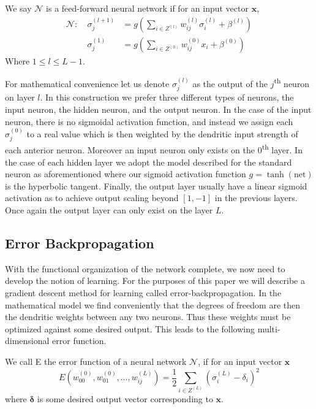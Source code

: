     \begin{definition}
    
    We say $\mathcal{N}$ is a feed-forward neural network if for an input vector $\pmb{x}$,
    \[
        \begin{aligned}
        \mathcal{N}:\ & \sigma_j^{(l+1)} &= g\left(\sum_{i \in Z^{(l)}}w_{ij}^{(l)}\sigma_i^{(l)} + \beta^{(l)}\right) \\ & \sigma_j^{(1)} &= g\left(\sum_{i \in Z^{(0)}}w_{ij}^{(0)}x_i + \beta^{(0)} \right)
        \end{aligned}
    \]
    Where $1\leq l \leq L-1$. 
    \end{definition}
    
    For mathematical convenience let us denote \( \sigma_j^{(l)}\) as the output of the \(j\)\textsuperscript{th} neuron on layer \(l\). In this construction we prefer three different types of neurons, the input neuron, the hidden neuron, and the output neuron. In the case of the input neuron, there is no sigmoidal activation function, and instead we assign each \( \sigma_j^{(0)}\) to a real value which is then weighted by the dendritic input strength of each anterior neuron. Moreover an input neuron only exists on the \(0\)\textsuperscript{th} layer. In the case of each hidden layer we adopt the model described for the standard neuron as aforementioned where our sigmoid activation function \(g = \tanh(\mathrm{net})\)  is the hyperbolic tangent.%
Finally, the output layer usually have a linear sigmoid activation as to achieve output scaling beyond \([1,-1]\) in the previous layers. Once again the output layer can only exist on the layer \(L\).  

\subsection{Error Backpropagation}
   With the  functional organization of the network complete, we now need to develop the notion of learning. For the purposes of this paper we will describe a gradient descent method for learning called error-backpropagation. In the mathematical model we find conveniently that the degrees of freedom are then the dendritic weights between any two neurons. Thus these weights must be optimized against some desired output. This leads to the following multi-dimensional error function.
   \begin{definition} We call E the error function of a neural network $\mathcal{N}$, if for an input vector \(\pmb{x}\)
\[ E\left(w_{00}^{(0)}, w_{01}^{(0)}, \dots ,w_{ij}^{(L)}\right) = \frac12\sum_{i \in Z^{(L)}}{\left(\sigma_i^{(L)}-\delta_i\right)^2}\]where \(\pmb{\delta}\) is some desired output vector corresponding to \(\pmb{x}\). 
\end{definition}

